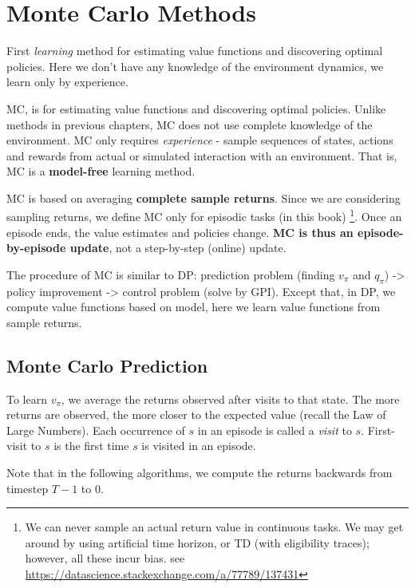 \documentclass[sutton_barto_notes.tex]{subfiles}
\begin{document}
\newpage
\section{Monte Carlo Methods}

First \textit{learning} method for estimating value functions and discovering optimal policies. Here we don't have any knowledge of the environment dynamics, we learn only by experience.

MC, is for estimating value functions and discovering optimal policies. Unlike methods in previous chapters, MC does not use complete knowledge of the environment. MC only requires \textit{experience} - sample sequences of states, actions and rewards from actual or simulated interaction with an environment. That is, MC is a \textbf{model-free} learning method.

MC is based on averaging \textbf{complete sample returns}. Since we are considering sampling returns, we define MC only for episodic tasks (in this book) \footnote{We can never sample an actual return value in continuous tasks. We may get around by using artificial time horizon, or TD (with eligibility traces); however, all these incur bias. see \url{https://datascience.stackexchange.com/a/77789/137431}}. Once an episode ends, the value estimates and policies change.
\textbf{MC is thus an episode-by-episode update}, not a step-by-step (online) update.

The procedure of MC is similar to DP: prediction problem (finding $v_\pi$ and $q_\pi$) -> policy improvement -> control problem (solve by GPI). Except that, in DP, we compute value functions based on model, here we learn value functions from sample returns.

\subsection{Monte Carlo Prediction}

To learn $v_\pi$, we average the returns observed after visits to that state. The more returns are observed, the more closer to the expected value (recall the Law of Large Numbers). Each occurrence of $s$ in an episode is called a \textit{visit} to $s$. First-visit to $s$ is the first time $s$ is visited in an episode.

Note that in the following algorithms, we compute the returns backwards from timestep $T-1$ to $0$.
\end{document}
